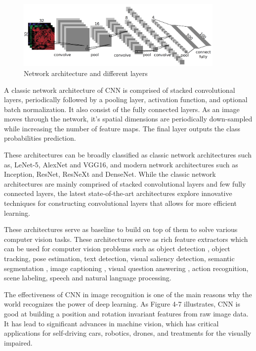 \begin{figure}[htbp]
\centering
\includegraphics[width=0.90\textwidth]{images/cnn-arch-1.png}
\caption{Network architecture and different layers}
\label{fig:CNN-1}
\end{figure}

A classic network architecture of CNN is comprised of stacked convolutional layers, periodically followed by a pooling layer, activation function, and optional batch normalization. It also consist of the fully connected layers. As an image moves through the network, it's spatial dimensions are periodically down-sampled while increasing the number of feature maps. The final layer outputs the class probabilities prediction.

These architectures can be broadly classified as classic network architectures such as, LeNet-5, AlexNet and VGG16, and modern network architectures such as Inception, ResNet, ResNeXt and DenseNet. While the classic network architectures are mainly comprised of stacked convolutional layers and few fully connected layers, the latest state-of-the-art architectures explore innovative techniques for constructing convolutional layers that allows for more efficient learning.

These architectures serve as baseline to build on top of them to solve various computer vision tasks. These architectures serve as rich feature extractors which can be used for computer vision problems such as object detection \cite{edseee.690947520140101}, object tracking, pose estimation, text detection, visual saliency detection, semantic segmentation \cite{edseee.690947520140101}, image captioning \cite{edsarx.1411.455520140101} \cite{edsarx.1411.495220140101} \cite{edseee.778086320160101}, visual question answering \cite{edseee.741063620150101} \cite{edsarx.1505.0561220150101} \cite{Wongsuphasawat2018}, action recognition, scene labeling, speech and natural language processing. 

The effectiveness of CNN in image recognition is one of the main reasons why the world recognizes the power of deep learning. As Figure 4-7 illustrates, CNN is good at building a position and rotation invariant features from raw image data. It has lead to significant advances in machine vision, which has critical applications for self-driving cars, robotics, drones, and treatments for the visually impaired.

